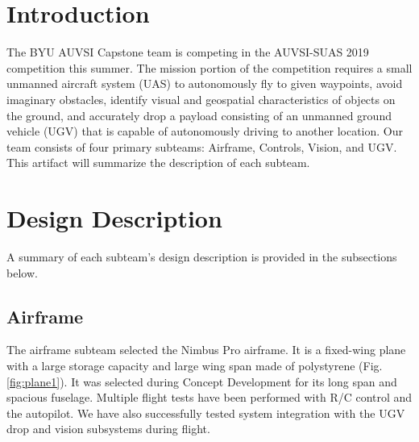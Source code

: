 \documentclass[]{auvsi_doc}
\begin{document}
\begin{AUVSITitlePage}
\begin{artifacttable}
\end{artifacttable}
\end{AUVSITitlePage}

\section{Introduction}

The BYU AUVSI Capstone team is competing in the AUVSI-SUAS 2019 competition this summer. The mission portion of the competition requires a small unmanned aircraft system (UAS) to autonomously fly to given waypoints, avoid imaginary obstacles, identify visual and geospatial characteristics of objects on the ground, and accurately drop a payload consisting of an unmanned ground vehicle (UGV) that is capable of autonomously driving to another location. Our team consists of four primary subteams: Airframe, Controls, Vision, and UGV. This artifact will summarize the description of each subteam.

\section{Design Description}
A summary of each subteam's design description is provided in the subsections below.

\subsection{Airframe}

The airframe subteam selected the Nimbus Pro airframe. It is a fixed-wing plane with a large storage capacity and large wing span made of polystyrene (Fig. \ref{fig:plane1}). It was selected during Concept Development for its long span and spacious fuselage. Multiple flight tests have been performed with
R/C control and the autopilot. We have also successfully tested system integration with the UGV drop and vision subsystems during flight.
\end{document}
